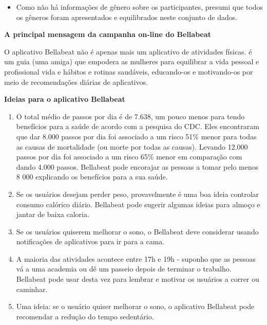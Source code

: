 \documentclass[
]{article}
\providecommand{\tightlist}{%
  \setlength{\itemsep}{0pt}\setlength{\parskip}{0pt}}
\begin{document}
\begin{itemize}
\tightlist
\item
  Como não há informações de gênero sobre os participantes, presumi que
  todos os gêneros foram apresentados e equilibrados neste conjunto de
  dados.
\end{itemize}

\textbf{A principal mensagem da campanha on-line do Bellabeat}

O aplicativo Bellabeat não é apenas mais um aplicativo de atividades
físicas. é um guia (uma amiga) que empodera as mulheres para equilibrar
a vida pessoal e profissional vida e hábitos e rotinas saudáveis,
educando-os e motivando-os por meio de recomendações diárias de
aplicativos.

\textbf{Ideias para o aplicativo Bellabeat}

\begin{enumerate}
\def\labelenumi{\arabic{enumi}.}
\item
  O total médio de passos por dia é de 7.638, um pouco menos para tendo
  benefícios para a saúde de acordo com a pesquisa do CDC. Eles
  encontraram que dar 8.000 passos por dia foi associado a um risco 51\%
  menor para todas as causas de mortalidade (ou morte por todas as
  causas). Levando 12.000 passos por dia foi associado a um risco 65\%
  menor em comparação com dando 4.000 passos. Bellabeat pode encorajar
  as pessoas a tomar pelo menos 8 000 explicando os benefícios para a
  sua saúde.
\item
  Se os usuários desejam perder peso, provavelmente é uma boa ideia
  controlar consumo calórico diário. Bellabeat pode sugerir algumas
  ideias para almoço e jantar de baixa caloria.
\item
  Se os usuários quiserem melhorar o sono, o Bellabeat deve considerar
  usando notificações de aplicativos para ir para a cama.
\item
  A maioria das atividades acontece entre 17h e 19h - suponho que as
  pessoas vá a uma academia ou dê um passeio depois de terminar o
  trabalho. Bellabeat pode usar desta vez para lembrar e motivar os
  usuários a correr ou caminhar.
\item
  Uma ideia: se o usuário quiser melhorar o sono, o aplicativo Bellabeat
  pode recomendar a redução do tempo sedentário.
\end{enumerate}
\end{document}
